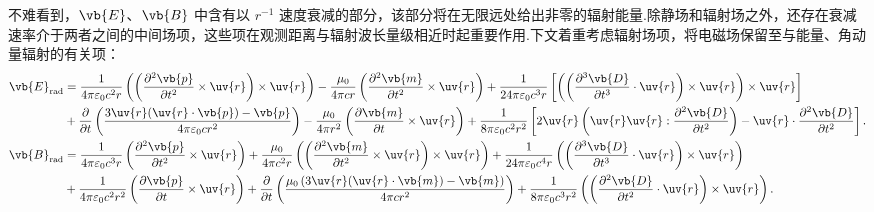 不难看到，\(\vb{E}\)、\(\vb{B}\) 中含有以 \(r^{-1}\) 速度衰减的部分，该部分将在无限远处给出非零的辐射能量.除静场和辐射场之外，还存在衰减速率介于两者之间的中间场项，这些项在观测距离与辐射波长量级相近时起重要作用.下文着重考虑辐射场项，将电磁场保留至与能量、角动量辐射的有关项：
\begin{align*}
	\vb{E}_{\text{rad}} &=\frac{1}{4\pi\varepsilon_0 c^2 r} \left( \left( \frac{\partial^2 \vb{p}}{\partial t^2} \times \uv{r} \right) \times \uv{r} \right) - \frac{\mu_0}{4\pi c r} \left( \frac{\partial^2 \vb{m}}{\partial t^2} \times \uv{r} \right) + \frac{1}{24\pi\varepsilon_0 c^3 r} \left[ \left( \left( \frac{\partial^3 \vb{D}}{\partial t^3} \cdot \uv{r} \right) \times \uv{r} \right) \times \uv{r} \right]\\
	&+ \frac{\partial}{\partial t} \left( \frac{3\uv{r}(\uv{r} \cdot \vb{p}) - \vb{p}}{4\pi\varepsilon_0 c r^2} \right) - \frac{\mu_0}{4\pi r^2} \left( \frac{\partial \vb{m}}{\partial t} \times \uv{r} \right) + \frac{1}{8\pi\varepsilon_0 c^2 r^2} \left[ 2\uv{r} \left( \uv{r} \uv{r} : \frac{\partial^2 \vb{D}}{\partial t^2} \right) - \uv{r} \cdot \frac{\partial^2 \vb{D}}{\partial t^2} \right].\\
	\vb{B}_{\text{rad}}&=\frac{1}{4\pi\varepsilon_0 c^3 r} \left( \frac{\partial^2 \vb{p}}{\partial t^2} \times \uv{r} \right) + \frac{\mu_0}{4\pi c^2 r} \left( \left( \frac{\partial^2 \vb{m}}{\partial t^2} \times \uv{r} \right) \times \uv{r} \right) + \frac{1}{24\pi\varepsilon_0 c^4 r} \left( \left( \frac{\partial^3 \vb{D}}{\partial t^3} \cdot \uv{r} \right) \times \uv{r} \right)\\
	&+ \frac{1}{4\pi\varepsilon_0 c^2 r^2} \left( \frac{\partial \vb{p}}{\partial t} \times \uv{r} \right) + \frac{\partial}{\partial t} \left( \frac{\mu_0 \left( 3\uv{r}(\uv{r} \cdot \vb{m}) - \vb{m} \right)}{4\pi c r^2} \right) + \frac{1}{8\pi\varepsilon_0 c^3 r^2} \left( \left( \frac{\partial^2 \vb{D}}{\partial t^2} \cdot \uv{r} \right) \times \uv{r} \right).
\end{align*}

